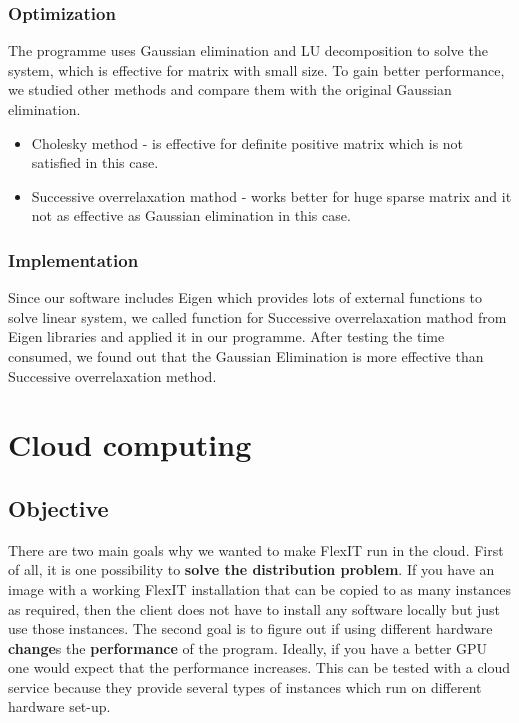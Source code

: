 \documentclass[a4paper, 11pt, article]{report}
\begin{document}
\subsubsection{Optimization}

The programme uses Gaussian elimination and LU decomposition to solve the system, which is effective for matrix with small size. To gain better performance, we studied other methods and compare them with the original Gaussian elimination.

\begin{itemize}
\item Cholesky method - is effective for definite positive matrix which is not satisfied in this case.
\item Successive overrelaxation mathod - works better for huge sparse matrix and it not as effective as Gaussian elimination in this case.
\end{itemize}

\subsubsection{Implementation}

Since our software includes Eigen which provides lots of external functions to solve linear system, we called function for Successive overrelaxation mathod from Eigen libraries and applied it in our programme. After testing the time consumed, we found out that the Gaussian Elimination is more effective than Successive overrelaxation method.

\section{Cloud computing}

\subsection{Objective}

There are two main goals why we wanted to make FlexIT run in the cloud. First of all, it is one possibility to \textbf{solve the distribution problem}. If you have an image with a working FlexIT installation that can be copied to as many instances as required, then the client does not have to install any software locally but just use those instances. The second goal is to figure out if using different hardware \textbf{change}s the \textbf{performance} of the program. Ideally, if you have a better GPU one would expect that the performance increases. This can be tested with a cloud service because they provide several types of instances which run on different hardware set-up. 
\end{document}
